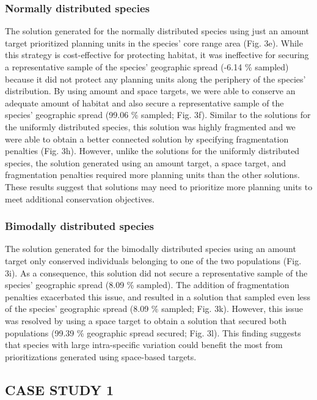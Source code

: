 \subsubsection{Normally distributed
species}\label{normally-distributed-species}

The solution generated for the normally distributed species using just
an amount target prioritized planning units in the species' core range
area (Fig. 3e). While this strategy is cost-effective for protecting
habitat, it was ineffective for securing a representative sample of the
species' geographic spread (-6.14 \% sampled) because it did not protect
any planning units along the periphery of the species' distribution. By
using amount and space targets, we were able to conserve an adequate
amount of habitat and also secure a representative sample of the
species' geographic spread (99.06 \% sampled; Fig. 3f). Similar to the
solutions for the uniformly distributed species, this solution was
highly fragmented and we were able to obtain a better connected solution
by specifying fragmentation penalties (Fig. 3h). However, unlike the
solutions for the uniformly distributed species, the solution generated
using an amount target, a space target, and fragmentation penalties
required more planning units than the other solutions. These results
suggest that solutions may need to prioritize more planning units to
meet additional conservation objectives.

\subsubsection{Bimodally distributed
species}\label{bimodally-distributed-species}

The solution generated for the bimodally distributed species using an
amount target only conserved individuals belonging to one of the two
populations (Fig. 3i). As a consequence, this solution did not secure a
representative sample of the species' geographic spread (8.09 \%
sampled). The addition of fragmentation penalties exacerbated this
issue, and resulted in a solution that sampled even less of the species'
geographic spread (8.09 \% sampled; Fig. 3k). However, this issue was
resolved by using a space target to obtain a solution that secured both
populations (99.39 \% geographic spread secured; Fig. 3l). This finding
suggests that species with large intra-specific variation could benefit
the most from prioritizations generated using space-based targets.

\subsection{CASE STUDY 1}\label{case-study-1}

